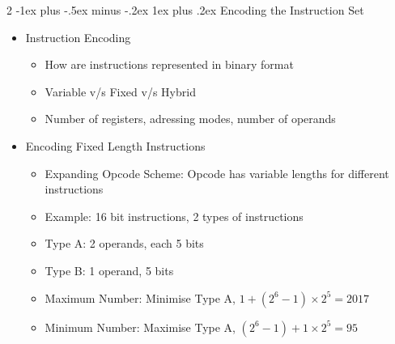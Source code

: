 \documentclass[10pt, portrait]{article}
\makeatletter
\renewcommand{\subsection}{\@startsection{subsection}{3}{0mm}%
                                {-1ex plus -.5ex minus -.2ex}%
                                {1ex plus .2ex}%
                                {\normalfont\small\bfseries}}%
\makeatother
\begin{document}
\begin{multicols*}{2}
\subsection{Encoding the Instruction Set}
\begin{itemize}
    \item Instruction Encoding
    \begin{itemize}
        \item How are instructions represented in binary format
        \item Variable v/s Fixed v/s Hybrid
        \item Number of registers, adressing modes, number of operands
    \end{itemize}
    \item Encoding Fixed Length Instructions
    \begin{itemize}
        \item Expanding Opcode Scheme: Opcode has variable lengths for different instructions
        \item Example: 16 bit instructions, 2 types of instructions
        \item Type A: 2 operands, each 5 bits
        \item Type B: 1 operand, 5 bits
        \item Maximum Number: Minimise Type A, $1 + (2^6-1) \times 2^5=2017$
        \item Minimum Number: Maximise Type A, $(2^6-1) + 1 \times 2^5=95$
    \end{itemize}
\end{itemize}


\end{multicols*}
\end{document}
